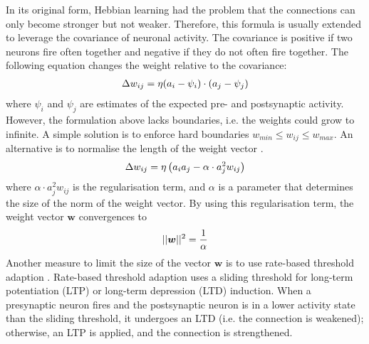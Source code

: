 In its original form, Hebbian learning had the problem that the connections can only become stronger but not weaker.
Therefore, this formula is usually extended to leverage the covariance of neuronal activity.
The covariance is positive if two neurons fire often together and negative if they do not often fire together.
The following equation changes the weight relative to the covariance:
%
\begin{align}\eqlbl{hebb_2}
	\Delta w_{ij} = \eta (a_i - \psi_i) \cdot (a_j - \psi_j)
\end{align}
%
where \(\psi_i\) and \(\psi_j\) are estimates of the expected pre- and postsynaptic activity.
However, the formulation above lacks boundaries, i.e. the weights could grow to infinite.
A simple solution is to enforce hard boundaries \(w_{min} \leq w_{ij} \leq w_{max}\).
An alternative is to normalise the length of the weight vector .
%
\begin{align}\eqlbl{hebb_3}
	\Delta w_{ij} = \eta \left( a_i a_j - \alpha \cdot a^2_j w_{ij} \right)
\end{align}
%
where $\alpha \cdot a^2_j w_{ij}$ is the regularisation term, and \(\alpha\) is a parameter that determines the size of the norm of the weight vector.
By using this regularisation term, the weight vector $\boldsymbol{w}$ convergences to
%
\begin{align}\eqlbl{hebb_31}
	||\boldsymbol{w}||^2 = \frac{1}{\alpha}
\end{align}
%
Another measure to limit the size of the vector $\boldsymbol{w}$ is to use rate-based threshold adaption . Rate-based threshold adaption uses a sliding threshold for long-term potentiation (LTP) or long-term depression (LTD) induction.
When a presynaptic neuron fires and the postsynaptic neuron is in a lower activity state than the sliding threshold, it undergoes an LTD (i.e. the connection is weakened); otherwise, an LTP is applied, and the connection is strengthened.   

